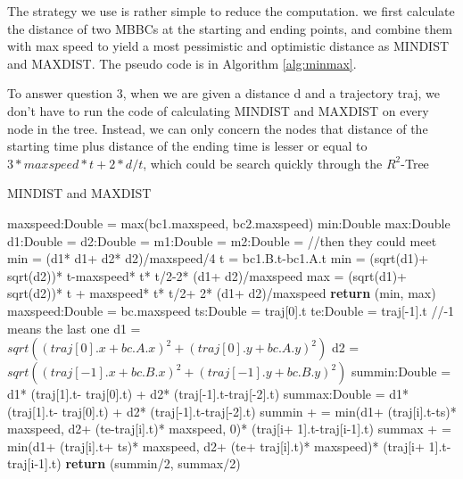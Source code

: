 \documentclass[sigplan]{acmart}
\begin{document}
The strategy we use is rather simple to reduce the computation. we first calculate the distance of two MBBCs at the starting and ending points, and combine them with max speed to yield a most pessimistic and optimistic distance as MINDIST and MAXDIST. The pseudo code is in Algorithm \ref{alg:minmax}.\par
To answer question 3, when we are given a distance d and a trajectory traj, we don't have to run the code of calculating MINDIST and MAXDIST on every node in the tree. Instead, we can only concern the nodes that distance of the starting time plus distance of the ending time is lesser or equal to $3* maxspeed* t + 2* d/t$, which could be search quickly through the $R^2$-Tree
\begin{algorithm}
\caption{MINDIST and MAXDIST} \label{alg:minmax}
\begin{algorithmic}[ht]
    \State maxspeed:Double = max(bc1.maxspeed, bc2.maxspeed)
    \State min:Double
    \State max:Double
    \State d1:Double = 
    \State d2:Double = 
    \State m1:Double = 
    \State m2:Double = 
     //then they could meet
        \State min = (d1* d1+ d2* d2)/maxspeed/4
    \Else
        \State t = bc1.B.t-bc1.A.t
        \State min = (sqrt(d1)+ sqrt(d2))* t-maxspeed* t* t/2-2* (d1+ d2)/maxspeed
    \EndIf
    \State max = (sqrt(d1)+ sqrt(d2))* t + maxspeed* t* t/2+ 2* (d1+ d2)/maxspeed
    \State \textbf{return} (min, max)
\EndFunction
{}
    \State maxspeed:Double = bc.maxspeed
    \State ts:Double = traj[0].t
    \State te:Double = traj[-1].t //-1 means the last one
    \State d1 = $sqrt((traj[0].x+ bc.A.x)^2+ (traj[0].y+ bc.A.y)^2)$
    \State d2 = $sqrt((traj[-1].x+ bc.B.x)^2+ (traj[-1].y+ bc.B.y)^2)$
    \State summin:Double = d1* (traj[1].t- traj[0].t) + d2* (traj[-1].t-traj[-2].t)
    \State summax:Double = d1* (traj[1].t- traj[0].t) + d2* (traj[-1].t-traj[-2].t)
        \State summin + = min(d1+ (traj[i].t-ts)* maxspeed, d2+ (te-traj[i].t)* maxspeed, 0)* (traj[i+ 1].t-traj[i-1].t)
        \State summax + = min(d1+ (traj[i].t+ ts)* maxspeed, d2+ (te+ traj[i].t)* maxspeed)* (traj[i+ 1].t-traj[i-1].t)
    \EndFor
    \State \textbf{return} (summin/2, summax/2)
\EndFunction
\end{algorithmic}
\end{algorithm}
\end{document}
